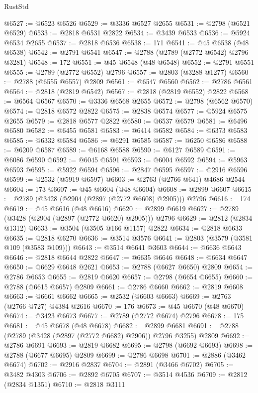 \begin{lexlean}{RustStd}
\begin{coremodule}
@6527 := @6523 @6526
@6529 := @3336 @6527 @2655
@6531 := @2798 (@6521 @6529)
@6533 := @2818 @6531 @2822
@6534 := @3439 @6533
@6536 := @5924 @6534 @2655
@6537 := @2818 @6536
@6538 := 171
@6541 := @45 @6538 (@48 @6538)
@6542 := @2791 @6541
@6547 := @2788 (@2789 (@2772 @6542) @2796 @3281)
@6548 := 172
@6551 := @45 @6548 (@48 @6548)
@6552 := @2791 @6551
@6555 := @2789 (@2772 @6552) @2796
@6557 := @2803 (@3288 @1277)
@6560 := @2788 (@6555 @6557) @2809
@6561 := @6547 @6560
@6562 := @2786 @6561
@6564 := @2818 (@2819 @6542)
@6567 := @2818 (@2819 @6552) @2822
@6568 := @6564 @6567
@6570 := @3336 @6568 @2655
@6572 := @2798 (@6562 @6570)
@6574 := @2818 @6572 @2822
@6575 := @2838 @6574
@6577 := @5924 @6575 @2655
@6579 := @2818 @6577 @2822
@6580 := @6537 @6579
@6581 := @6496 @6580
@6582 := @6455 @6581
@6583 := @6414 @6582
@6584 := @6373 @6583
@6585 := @6332 @6584
@6586 := @6291 @6585
@6587 := @6250 @6586
@6588 := @6209 @6587
@6589 := @6168 @6588
@6590 := @6127 @6589
@6591 := @6086 @6590
@6592 := @6045 @6591
@6593 := @6004 @6592
@6594 := @5963 @6593
@6595 := @5922 @6594
@6596 := @2847 @6595
@6597 := @2916 @6596
@6599 := @2532 (@5919 @6597)
@6603 := @2763 (@2766 @641) @4686 @2544
@6604 := 173
@6607 := @45 @6604 (@48 @6604)
@6608 := @2899 @6607
@6615 := @2789 (@3428 (@2904 (@2897 (@2772 @6608) @2905))) @2796
@6616 := 174
@6619 := @45 @6616 (@48 @6616)
@6620 := @2899 @6619
@6627 := @2789 (@3428 (@2904 (@2897 (@2772 @6620) @2905))) @2796
@6629 := @2812 (@2834 @1312)
@6633 := @3504 (@3505 @166 @1157) @2822
@6634 := @2818 @6633
@6635 := @2818 @6270
@6636 := @3514 @3576
@6641 := @2803 (@3579 (@3581 @109 (@3583 @109)))
@6643 := @3514 @6641 @3603
@6644 := @6636 @6643
@6646 := @2818 @6644 @2822
@6647 := @6635 @6646
@6648 := @6634 @6647
@6650 := @6629 @6648 @2621
@6653 := @2788 (@6627 @6650) @2809
@6654 := @2786 @6653
@6655 := @2819 @6620
@6657 := @2798 (@6654 @6655)
@6660 := @2788 (@6615 @6657) @2809
@6661 := @2786 @6660
@6662 := @2819 @6608
@6663 := @6661 @6662
@6665 := @2532 (@6603 @6663)
@6669 := @2763 (@2766 @727) @4384 @2616
@6670 := 176
@6673 := @45 @6670 (@48 @6670)
@6674 := @3423 @6673
@6677 := @2789 (@2772 @6674) @2796
@6678 := 175
@6681 := @45 @6678 (@48 @6678)
@6682 := @2899 @6681
@6691 := @2788 (@2789 (@3428 (@2897 (@2772 @6682) @2906)) @2796 @3255) @2809
@6692 := @2786 @6691
@6693 := @2819 @6682
@6695 := @2798 (@6692 @6693)
@6698 := @2788 (@6677 @6695) @2809
@6699 := @2786 @6698
@6701 := @2886 (@3462 @6674)
@6702 := @2916 @2837
@6704 := @2891 (@3466 @6702)
@6705 := @3482 @4303
@6706 := @2892 @6705
@6707 := @3514 @4536
@6709 := @2812 (@2834 @1351)
@6710 := @2818 @3111

\end{coremodule}
\end{lexlean}
